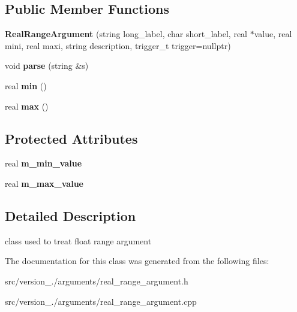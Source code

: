\subsection*{Public Member Functions}
\begin{DoxyCompactItemize}
\item 
\mbox{\label{classez_1_1arguments_1_1RealRangeArgument_a202c1ae7073863b79c06c1dd036c2a98}} 
{\bfseries Real\+Range\+Argument} (string long\+\_\+label, char short\+\_\+label, real $\ast$value, real mini, real maxi, string description, trigger\+\_\+t trigger=nullptr)
\item 
\mbox{\label{classez_1_1arguments_1_1RealRangeArgument_a0dff4c245d721489f4469db969464302}} 
void {\bfseries parse} (string \&s)
\item 
\mbox{\label{classez_1_1arguments_1_1RealRangeArgument_a81ce0b0f73906303e776e5d9c63d1dd4}} 
real {\bfseries min} ()
\item 
\mbox{\label{classez_1_1arguments_1_1RealRangeArgument_a1f2648bd7af2a40c2e75d6c628fb7c96}} 
real {\bfseries max} ()
\end{DoxyCompactItemize}
\subsection*{Protected Attributes}
\begin{DoxyCompactItemize}
\item 
\mbox{\label{classez_1_1arguments_1_1RealRangeArgument_ad74039d5ab5580b56bafc377a0812813}} 
real {\bfseries m\+\_\+min\+\_\+value}
\item 
\mbox{\label{classez_1_1arguments_1_1RealRangeArgument_a0cf9f1262b5e7cd44536525e821dd570}} 
real {\bfseries m\+\_\+max\+\_\+value}
\end{DoxyCompactItemize}


\subsection{Detailed Description}
class used to treat float range argument 

The documentation for this class was generated from the following files\+:\begin{DoxyCompactItemize}
\item 
src/version\+\_./arguments/real\+\_\+range\+\_\+argument.\+h\item 
src/version\+\_./arguments/real\+\_\+range\+\_\+argument.\+cpp\end{DoxyCompactItemize}

